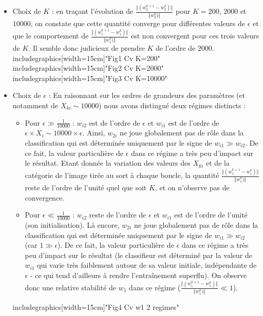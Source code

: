 \documentclass[a4paper,11pt]{article}
\begin{document}
\begin{itemize}
	\item  Choix de $K$ : en traçant l'évolution de $  \frac{\Vert(w_2^{k+1} - w_2^{k})\Vert}{\Vert w_2^{k})\Vert}$ pour $K = 200$, $2000$ et $10000$, on constate que cette quantité converge pour différentes valeurs de $\epsilon$ et que le comportement de $  \frac{\Vert(w_1^{k+1} - w_1^{k})\Vert}{\Vert w_1^{k})\Vert}$ est non convergent pour ces trois valeurs de $K$. Il semble donc judicieux de prendre $K$ de l'ordre de $2000$. \\

includegraphics[width=15cm]{"Fig1 Cv K=200"}\\
includegraphics[width=15cm]{"Fig2 Cv K=2000"}\\
includegraphics[width=15cm]{"Fig3 Cv K=10000"}\\
	
	\item Choix de $\epsilon$ : En raisonnant sur les ordres de grandeurs des paramètres (et notamment de $X_{ki} \sim 10000$) nous avons distingué deux régimes distincts :\\
	
	\begin{itemize}
		\item Pour $\epsilon \gg \frac{1}{10000}$ : $w_{i2}$ est de l'ordre de $\epsilon$ et $w_{i1}$ est de l'ordre de $\epsilon \times X_i \sim 10000 \times \epsilon$. Ainsi, $w_{2i}$ ne joue globalement pas de rôle dans la classification qui est déterminée uniquement par le signe de $w_{i1} \gg w_{i2}$. De ce fait, la valeur particulière de $\epsilon$ dans ce régime a très peu d'impact sur le résultat. Etant donnée la variation des valeurs des $X_{ki}$ et de la catégorie de l'image tirée au sort à chaque boucle, la quantité $  \frac{\Vert(w_1^{k+1} - w_1^{k})\Vert}{\Vert w_1^{k})\Vert}$ reste de l'ordre de l'unité quel que soit $K$, et on n'observe pas de convergence.\\
		
		\item Pour $\epsilon \ll \frac{1}{10000}$ : $w_{i2}$ reste de l'ordre de $\epsilon$ et $w_{i1}$ est de l'ordre de l'unité (son initialisation). Là encore, $w_{2i}$ ne joue globalement pas de rôle dans la classification qui est déterminée uniquement par le signe de $w_{i1} \gg w_{i2}$ (car $1 \gg \epsilon$). De ce fait, la valeur particulière de $\epsilon$ dans ce régime a très peu d'impact sur le résultat (le classifieur est déterminé par la valeur de $w_{i1}$ qui varie très faiblement autour de sa valeur initiale, indépendante de $\epsilon$ - ce qui tend d'ailleurs à rendre l'entraînement superflu). On observe donc une relative stabilité de $w_1$ dans ce régime ($  \frac{\Vert(w_1^{k+1} - w_1^{k})\Vert}{\Vert w_1^{k})\Vert} \ll 1$). \\
	\end{itemize}
includegraphics[width=15cm]{"Fig4 Cv w1 2 regimes"}\\


\end{itemize}
\end{document}
